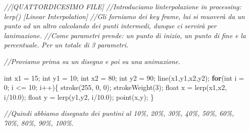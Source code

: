 \documentclass[
]{article}
\newenvironment{Shaded}{}{}
\newcommand{\CommentTok}[1]{\textcolor[rgb]{0.38,0.63,0.69}{\textit{#1}}}
\newcommand{\ControlFlowTok}[1]{\textcolor[rgb]{0.00,0.44,0.13}{\textbf{#1}}}
\newcommand{\DataTypeTok}[1]{\textcolor[rgb]{0.56,0.13,0.00}{#1}}
\newcommand{\DecValTok}[1]{\textcolor[rgb]{0.25,0.63,0.44}{#1}}
\newcommand{\FloatTok}[1]{\textcolor[rgb]{0.25,0.63,0.44}{#1}}
\newcommand{\FunctionTok}[1]{\textcolor[rgb]{0.02,0.16,0.49}{#1}}
\newcommand{\NormalTok}[1]{#1}
\newcommand{\OperatorTok}[1]{\textcolor[rgb]{0.40,0.40,0.40}{#1}}
\begin{document}
\begin{Shaded}
\begin{Highlighting}[]
\CommentTok{//[QUATTORDICESIMO FILE]}
\CommentTok{//Introduciamo l\textquotesingle{}interpolazione in processing: \textquotesingle{}lerp()\textquotesingle{} [Linear Interpolation]}
\CommentTok{//Gli forniamo dei key frame, lui si muoverà da un punto ad un altro calcolando dei punti intermedi, dunque ci servirà per l\textquotesingle{}animazione.}
\CommentTok{//Come parametri prende: un punto di inizio, un punto di fine e la percentuale. Per un totale di 3 parametri.}

\CommentTok{//Proviamo prima su un disegno e poi su una animazione.}

\DataTypeTok{int}\NormalTok{ x1 }\OperatorTok{=} \DecValTok{15}\OperatorTok{;}
\DataTypeTok{int}\NormalTok{ y1 }\OperatorTok{=} \DecValTok{10}\OperatorTok{;}
\DataTypeTok{int}\NormalTok{ x2 }\OperatorTok{=} \DecValTok{80}\OperatorTok{;}
\DataTypeTok{int}\NormalTok{ y2 }\OperatorTok{=} \DecValTok{90}\OperatorTok{;}
\FunctionTok{line}\OperatorTok{(}\NormalTok{x1}\OperatorTok{,}\NormalTok{y1}\OperatorTok{,}\NormalTok{x2}\OperatorTok{,}\NormalTok{y2}\OperatorTok{);}
\ControlFlowTok{for}\OperatorTok{(}\DataTypeTok{int}\NormalTok{ i }\OperatorTok{=} \DecValTok{0}\OperatorTok{;}\NormalTok{ i }\OperatorTok{\textless{}=} \DecValTok{10}\OperatorTok{;}\NormalTok{ i}\OperatorTok{++)\{} 
    \FunctionTok{stroke}\OperatorTok{(}\DecValTok{255}\OperatorTok{,} \DecValTok{0}\OperatorTok{,} \DecValTok{0}\OperatorTok{);}
    \FunctionTok{strokeWeight}\OperatorTok{(}\DecValTok{3}\OperatorTok{);}
    \DataTypeTok{float}\NormalTok{ x }\OperatorTok{=} \FunctionTok{lerp}\OperatorTok{(}\NormalTok{x1}\OperatorTok{,}\NormalTok{x2}\OperatorTok{,}\NormalTok{ i}\OperatorTok{/}\FloatTok{10.0}\OperatorTok{);} 
    \DataTypeTok{float}\NormalTok{ y }\OperatorTok{=} \FunctionTok{lerp}\OperatorTok{(}\NormalTok{y1}\OperatorTok{,}\NormalTok{y2}\OperatorTok{,}\NormalTok{ i}\OperatorTok{/}\FloatTok{10.0}\OperatorTok{);}
    \FunctionTok{point}\OperatorTok{(}\NormalTok{x}\OperatorTok{,}\NormalTok{y}\OperatorTok{);}
\OperatorTok{\}}

\CommentTok{//Quindi abbiamo disegnato dei puntini al 10\%, 20\%, 30\%, 40\%, 50\%, 60\%, 70\%, 80\%, 90\%, 100\%.}
\end{Highlighting}
\end{Shaded}
\end{document}
